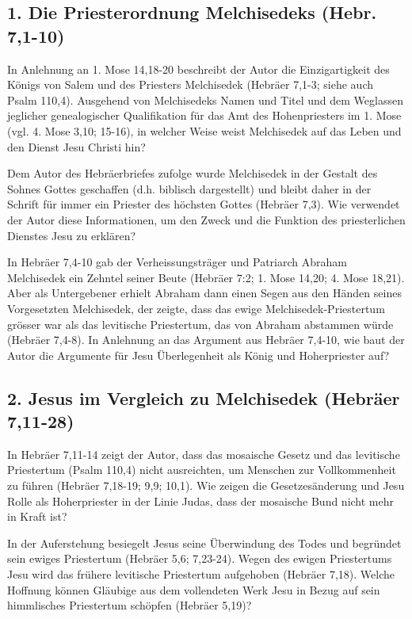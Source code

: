 \documentclass[
  12pt,
]{krantz}
\begin{document}
\hypertarget{die-priesterordnung-melchisedeks-hebr.-71-10}{%
\subsection{1. Die Priesterordnung Melchisedeks (Hebr. 7,1-10)}\label{die-priesterordnung-melchisedeks-hebr.-71-10}}

In Anlehnung an 1. Mose 14,18-20 beschreibt der Autor die Einzigartigkeit des Königs von Salem und des Priesters Melchisedek (Hebräer 7,1-3; siehe auch Psalm 110,4). Ausgehend von Melchisedeks Namen und Titel und dem Weglassen jeglicher genealogischer Qualifikation für das Amt des Hohenpriesters im 1. Mose (vgl. 4. Mose 3,10; 15-16), in welcher Weise weist Melchisedek auf das Leben und den Dienst Jesu Christi hin?

Dem Autor des Hebräerbriefes zufolge wurde Melchisedek in der Gestalt des Sohnes Gottes geschaffen (d.h. biblisch dargestellt) und bleibt daher in der Schrift für immer ein Priester des höchsten Gottes (Hebräer 7,3). Wie verwendet der Autor diese Informationen, um den Zweck und die Funktion des priesterlichen Dienstes Jesu zu erklären?

In Hebräer 7,4-10 gab der Verheissungsträger und Patriarch Abraham Melchisedek ein Zehntel seiner Beute (Hebräer 7:2; 1. Mose 14,20; 4. Mose 18,21). Aber als Untergebener erhielt Abraham dann einen Segen aus den Händen seines Vorgesetzten Melchisedek, der zeigte, dass das ewige Melchisedek-Priestertum grösser war als das levitische Priestertum, das von Abraham abstammen würde (Hebräer 7,4-8). In Anlehnung an das Argument aus Hebräer 7,4-10, wie baut der Autor die Argumente für Jesu Überlegenheit als König und Hoherpriester auf?

\hypertarget{jesus-im-vergleich-zu-melchisedek-hebruxe4er-711-28}{%
\subsection{2. Jesus im Vergleich zu Melchisedek (Hebräer 7,11-28)}\label{jesus-im-vergleich-zu-melchisedek-hebruxe4er-711-28}}

In Hebräer 7,11-14 zeigt der Autor, dass das mosaische Gesetz und das levitische Priestertum (Psalm 110,4) nicht ausreichten, um Menschen zur Vollkommenheit zu führen (Hebräer 7,18-19; 9,9; 10,1). Wie zeigen die Gesetzesänderung und Jesu Rolle als Hoherpriester in der Linie Judas, dass der mosaische Bund nicht mehr in Kraft ist?

In der Auferstehung besiegelt Jesus seine Überwindung des Todes und begründet sein ewiges Priestertum (Hebräer 5,6; 7,23-24). Wegen des ewigen Priestertums Jesu wird das frühere levitische Priestertum aufgehoben (Hebräer 7,18). Welche Hoffnung können Gläubige aus dem vollendeten Werk Jesu in Bezug auf sein himmlisches Priestertum schöpfen (Hebräer 5,19)?
\end{document}
